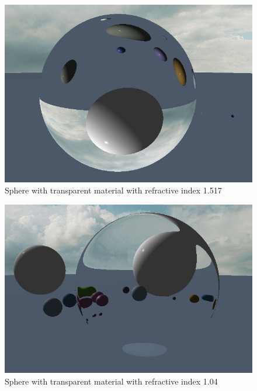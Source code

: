 \documentclass[final]{cmpreport}
\begin{document}
\begin{figure}
    \centering
    \includegraphics[width=\textwidth]{img/refraction_solid.png}
    \caption{Sphere with transparent material with refractive index 1.517}
    \label{sphere_refract_solid}
\end{figure}

\begin{figure}
    \centering
    \includegraphics[width=\textwidth]{img/refraction_hollow.png}
    \caption{Sphere with transparent material with refractive index 1.04}
    \label{sphere_refract_hollow}
\end{figure}
\end{document}
